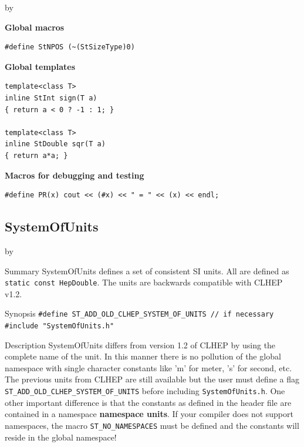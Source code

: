 \documentclass[twoside]{article}
\newcommand{\comp}[1]{\texttt{#1}}%
\newcommand{\entrylabel}[1]{\mbox{\textbf{{#1}}}\hfil}%
\newenvironment{entry}
{\begin{list}{}%
    {\renewcommand{\makelabel}{\entrylabel}%
     \setlength{\labelwidth}{90pt}%
     \setlength{\leftmargin}{\labelwidth}
     \advance\leftmargin by \labelsep%
      }%
    }%
  {\end{list}}
\newcommand{\Entrylabel}[1]%
{\raisebox{0pt}[1ex][0pt]{\makebox[\labelwidth][l]%
    {\parbox[t]{\labelwidth}{\hspace{0pt}\textbf{{#1}}}}}}
\newenvironment{Entry}%
{\renewcommand{\entrylabel}{\Entrylabel}\begin{entry}}%
  {\end{entry}}
\begin{document}
\begin{description}
\begin{Entry}
{\bf Global macros} \\ 
\begin{verbatim}  
#define StNPOS (~(StSizeType)0)
\end{verbatim}

{\bf Global templates} \\  
\begin{verbatim}
template<class T>
inline StInt sign(T a)
{ return a < 0 ? -1 : 1; }

template<class T>
inline StDouble sqr(T a)
{ return a*a; }
\end{verbatim}

{\bf Macros for debugging and testing} \\ 
\begin{verbatim}
#define PR(x) cout << (#x) << " = " << (x) << endl;
\end{verbatim}
\end{Entry}
\newpage

%
\subsection{SystemOfUnits} 
\label{SystemOfUnits}
\begin{Entry}
\item[Summary]
    SystemOfUnits defines a set of consistent SI units.
    All are defined as \comp{static const HepDouble}.
    The units are backwards compatible with CLHEP v1.2.

\item[Synopsis]
  \verb+#define ST_ADD_OLD_CLHEP_SYSTEM_OF_UNITS // if necessary+
  \verb+#include "SystemOfUnits.h"+
    
    
\item[Description] SystemOfUnits differs from version 1.2 of
    CLHEP by using the complete name of the unit.  In
    this manner there is no pollution of the global namespace with
    single character constants like 'm' for meter, 's' for second,
    etc.  The previous units from CLHEP are still available but the
    user must define a flag
    \texttt{ST\_ADD\_OLD\_CLHEP\_\-SYSTEM\_\-OF\_UNITS} before including
    \texttt{SystemOfUnits.h}.  One other important difference is that
    the constants as defined in the header file are contained in a
    namespace {\bf namespace units}.  If your
    compiler does not support namespaces, the macro
    \texttt{ST\_NO\_NAMESPACES} must be defined and the constants will
    reside in the global namespace!
    

\end{Entry}
\end{description}
\end{document}
